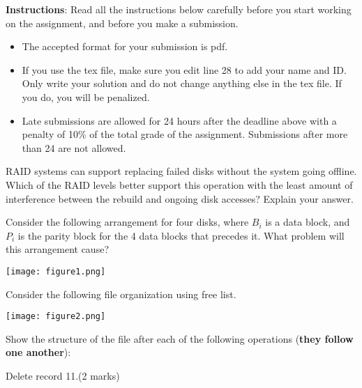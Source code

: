 \documentclass[a4 paper]{article}
\begin{document}
\textbf{Instructions}: Read all the instructions below carefully before you start working on the assignment, and before you make a submission.
\begin{itemize}
    \item The accepted format for your submission is pdf. 
    \item If you use the tex file, make sure you edit line 28 to add your name and ID. Only write your solution and do not change anything else in the tex file. If you do, you will be penalized.
    \item Late submissions are allowed for 24 hours after the deadline above with a penalty of 10\% of the total grade of the assignment. Submissions after more than 24 are not allowed.
\end{itemize}

RAID systems can support replacing failed disks without the system going offline. Which of the RAID levels better support this operation with the least amount of interference between the rebuild and ongoing disk accesses? Explain your answer.

Consider the following arrangement for four disks, where $B_{i}$ is a data block, and $P_{i}$ is the parity block for the 4 data blocks that precedes it. What problem will this arrangement cause?

{\centering \texttt{[image: figure1.png]}}



Consider the following file organization using free list.

{\centering \texttt{[image: figure2.png]}}

Show the structure of the file after each of the following operations (\textbf{they follow one another}):

 Delete record 11.\indent (2 marks)
\end{document}
